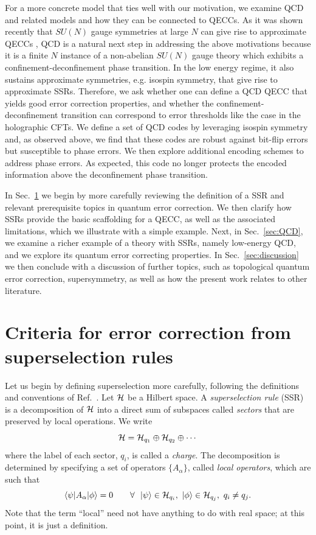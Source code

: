 \documentclass[11pt,english]{article}
\newcommand{\Sec}[1]{Sec.~\ref{#1}}
\newcommand{\bra}[1]{\langle #1|}
\newcommand{\ket}[1]{|#1\rangle}
\newcommand{\Hil}{{\cal H}}
\begin{document}
For a more concrete model that ties well with our motivation, we examine QCD and related models and how they can be connected to QECCs. As it was shown recently that  $SU(N)$ gauge symmetries at large $N$ can give rise to approximate QECCs \cite{Bao_2022,Milekhin,largeNcode}, QCD is a natural next step in addressing the above motivations because it is a finite $N$ instance of a non-abelian $SU(N)$ gauge theory which exhibits a confinement-deconfinement phase transition. In the low energy regime, it also sustains approximate symmetries, e.g. isospin symmetry, that give rise to approximate SSRs. Therefore, we ask whether one can define a QCD QECC that yields good error correction properties, and whether the confinement-deconfinement transition can correspond to error thresholds like the case in the holographic CFTs. We define a set of QCD codes by leveraging isospin symmetry and, as observed above, we find that these codes are robust against bit-flip errors but susceptible to phase errors. We then explore additional encoding schemes to address phase errors. As expected, this code no longer protects the encoded information above the deconfinement phase transition.


In \Sec{sec:QECC-SSR} we begin by more carefully reviewing the definition of a SSR and relevant prerequisite topics in quantum error correction.
We then clarify how SSRs provide the basic scaffolding for a QECC, as well as the associated limitations, which we illustrate with a simple  example.
Next, in \Sec{sec:QCD}, we examine a richer example of a theory with SSRs, namely low-energy QCD, and we explore its quantum error correcting properties.
In \Sec{sec:discussion} we then conclude with a discussion of further topics, such as topological quantum error correction, supersymmetry, as well as how the present work relates to other literature.





\section{Criteria for error correction from superselection rules}
\label{sec:QECC-SSR}

Let us begin by defining superselection more carefully, following the definitions and conventions of Ref.~\cite{Kitaev:2003zj}.
Let $\Hil$ be a Hilbert space.
A \emph{superselection rule} (SSR) is a decomposition of $\Hil$ into a direct sum of subspaces called \emph{sectors} that are preserved by local operations.
We write
\begin{equation}
    \Hil = \Hil_{q_1} \oplus \Hil_{q_2} \oplus \cdots
\end{equation}
where the label of each sector, $q_i$, is called a \emph{charge}.
The decomposition is determined by specifying a set of operators $\{A_\alpha\}$, called \emph{local operators}, which are such that
\begin{equation}
    \bra{\psi} A_\alpha \ket{\phi} = 0 \qquad \forall ~ ~ \ket{\psi} \in \Hil_{q_i}, ~ \ket{\phi} \in \Hil_{q_j}, ~ q_i \neq q_j.
\end{equation}
Note that the term ``local'' need not have anything to do with real space; at this point, it is just a definition.
\end{document}
